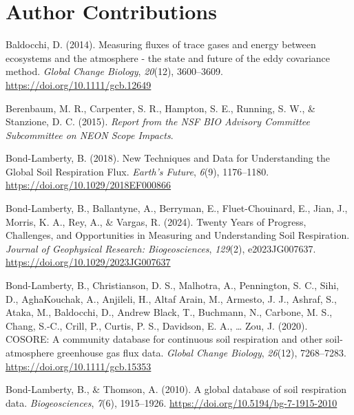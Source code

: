 \documentclass[
  letterpaper,
  DIV=11,
  numbers=noendperiod]{scrartcl}
\newlength{\cslhangindent}
\newenvironment{CSLReferences}[2] %
 {\begin{list}{}{%
  \setlength{\itemindent}{0pt}
  \setlength{\leftmargin}{0pt}
  \setlength{\parsep}{0pt}
  \ifodd #1
   \setlength{\leftmargin}{\cslhangindent}
   \setlength{\itemindent}{-1\cslhangindent}
  \fi
  \setlength{\itemsep}{#2\baselineskip}}}
 {\end{list}}
\begin{document}
\section*{Author Contributions}\label{author-contributions}

\label{refs}
\begin{CSLReferences}{1}{0}
Baldocchi, D. (2014). Measuring fluxes of trace gases and energy between
ecosystems and the atmosphere - the state and future of the eddy
covariance method. \emph{Global Change Biology}, \emph{20}(12),
3600--3609. \url{https://doi.org/10.1111/gcb.12649}

Berenbaum, M. R., Carpenter, S. R., Hampton, S. E., Running, S. W., \&
Stanzione, D. C. (2015). \emph{Report from the {NSF BIO Advisory
Committee Subcommittee} on {NEON Scope Impacts}}.

Bond-Lamberty, B. (2018). New {Techniques} and {Data} for
{Understanding} the {Global Soil Respiration Flux}. \emph{Earth's
Future}, \emph{6}(9), 1176--1180.
\url{https://doi.org/10.1029/2018EF000866}

Bond-Lamberty, B., Ballantyne, A., Berryman, E., Fluet-Chouinard, E.,
Jian, J., Morris, K. A., Rey, A., \& Vargas, R. (2024). Twenty {Years}
of {Progress}, {Challenges}, and {Opportunities} in {Measuring} and
{Understanding Soil Respiration}. \emph{Journal of Geophysical Research:
Biogeosciences}, \emph{129}(2), e2023JG007637.
\url{https://doi.org/10.1029/2023JG007637}

Bond-Lamberty, B., Christianson, D. S., Malhotra, A., Pennington, S. C.,
Sihi, D., AghaKouchak, A., Anjileli, H., Altaf Arain, M., Armesto, J.
J., Ashraf, S., Ataka, M., Baldocchi, D., Andrew Black, T., Buchmann,
N., Carbone, M. S., Chang, S.-C., Crill, P., Curtis, P. S., Davidson, E.
A., \ldots{} Zou, J. (2020). {COSORE}: {A} community database for
continuous soil respiration and other soil-atmosphere greenhouse gas
flux data. \emph{Global Change Biology}, \emph{26}(12), 7268--7283.
\url{https://doi.org/10.1111/gcb.15353}

Bond-Lamberty, B., \& Thomson, A. (2010). A global database of soil
respiration data. \emph{Biogeosciences}, \emph{7}(6), 1915--1926.
\url{https://doi.org/10.5194/bg-7-1915-2010}


\end{CSLReferences}
\end{document}
